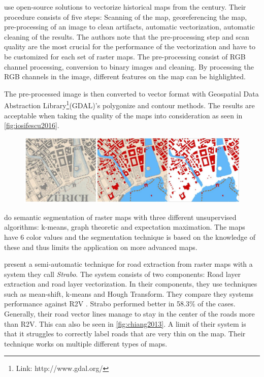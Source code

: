\citet{Iosifescu2016} use open-source solutions to vectorize historical maps from the  century. Their procedure consists of five steps: Scanning of the map, georeferencing the map, pre-processing of an image to clean artifacts, automatic vectorization, automatic cleaning of the results. The authors note that the pre-processing step and scan quality are the most crucial for the performance of the vectorization and have to be customized for each set of raster maps. The pre-processing consist of RGB channel processing, conversion to binary images and cleaning. By processing the RGB channels in the image, different features on the map can be highlighted.

The pre-processed image is then converted to vector format with Geospatial Data Abstraction Library\footnote{Link: http://www.gdal.org/}(GDAL)'s polygonize and contour methods. The results are acceptable when taking the quality of the maps into consideration as seen in \autoref{fig:iosifescu2016}. 

\begin{figure}[H]
	\centering
	\includegraphics[width=0.9\linewidth]{fig/iosifescu2016.png}
	\label{fig:iosifescu2016}
\end{figure}


\citet{Henderson} do semantic segmentation of raster maps with three different unsupervised algorithms: k-means, graph theoretic and expectation maximation. The maps have 6 color values and the segmentation technique is based on the knowledge of these and thus limits the application on more advanced maps. 

\citet{Chiang2013} present a semi-automatic technique for road extraction from raster maps with a system they call \emph{Strabo}. The system consists of two components: Road layer extraction and road layer vectorization. In their components, they use techniques such as mean-shift, k-means and Hough Transform. They compare they systems performance against R2V \cite{Wu1999}. Strabo performed better in 58.3\% of the cases. Generally, their road vector lines manage to stay in the center of the roads more than R2V. This can also be seen in \autoref{fig:chiang2013}. A limit of their system is that it struggles to correctly label roads that are very thin on the map. Their technique works on multiple different types of maps. 

